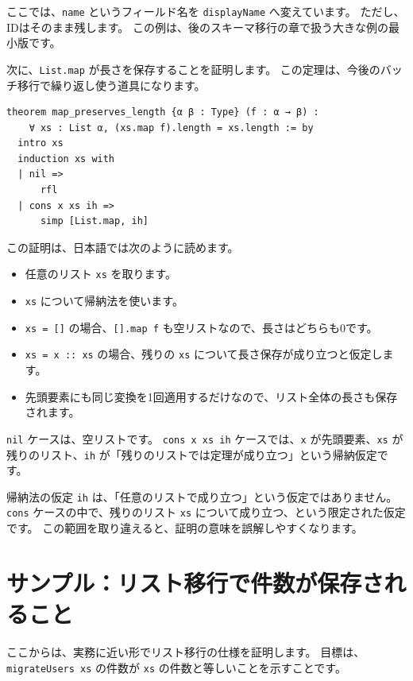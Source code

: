 ここでは、\texttt{name} というフィールド名を \texttt{displayName} へ変えています。
ただし、IDはそのまま残します。
この例は、後のスキーマ移行の章で扱う大きな例の最小版です。

次に、\texttt{List.map} が長さを保存することを証明します。
この定理は、今後のバッチ移行で繰り返し使う道具になります。

\begin{listing}[htbp]
\begin{verbatim}
theorem map_preserves_length {α β : Type} (f : α → β) :
    ∀ xs : List α, (xs.map f).length = xs.length := by
  intro xs
  induction xs with
  | nil =>
      rfl
  | cons x xs ih =>
      simp [List.map, ih]
\end{verbatim}
\caption{\texttt{map\_preserves\_length}}
\label{lst:induction-map-length}
\end{listing}

この証明は、日本語では次のように読めます。

\begin{itemize}
\item 任意のリスト \texttt{xs} を取ります。
\item \texttt{xs} について帰納法を使います。
\item \texttt{xs = []} の場合、\texttt{[].map f} も空リストなので、長さはどちらも0です。
\item \texttt{xs = x :: xs} の場合、残りの \texttt{xs} について長さ保存が成り立つと仮定します。
\item 先頭要素にも同じ変換を1回適用するだけなので、リスト全体の長さも保存されます。
\end{itemize}

\texttt{nil} ケースは、空リストです。
\texttt{cons x xs ih} ケースでは、\texttt{x} が先頭要素、\texttt{xs} が残りのリスト、\texttt{ih} が「残りのリストでは定理が成り立つ」という帰納仮定です。

帰納法の仮定 \texttt{ih} は、「任意のリストで成り立つ」という仮定ではありません。
\texttt{cons} ケースの中で、残りのリスト \texttt{xs} について成り立つ、という限定された仮定です。
この範囲を取り違えると、証明の意味を誤解しやすくなります。

\section{サンプル：リスト移行で件数が保存されること}

ここからは、実務に近い形でリスト移行の仕様を証明します。
目標は、\texttt{migrateUsers xs} の件数が \texttt{xs} の件数と等しいことを示すことです。


